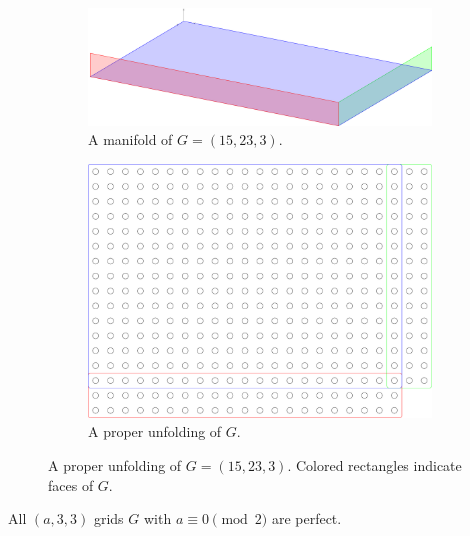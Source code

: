 \begin{figure}[]
\centering
\begin{subfigure}{0.45\textwidth}
	\includegraphics[width=\textwidth]{figures/7/17x25x1_manifold_3d.pdf}
	\caption{A manifold of $G= (15,23,3)$.}
	\label{}
\end{subfigure} \hfill%
\begin{subfigure}{0.45\textwidth}
	\includegraphics[width=\textwidth]{figures/7/17x25x1_manifold.pdf}
	\caption{A proper unfolding of $G$.}
	\label{}
\end{subfigure}
\caption{A proper unfolding of $G= (15,23,3)$. Colored rectangles indicate faces of $G$. }
\label{fig:17x25x1_manifold}
\end{figure} 

\begin{con}
All $(a,3,3)$ grids $G$ with $a \equiv 0 \pmod 2$ are perfect. 
\end{con}


